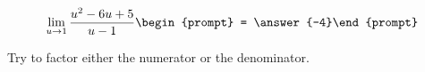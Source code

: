 \documentclass{ximera}
\author{Bart Snapp}
\begin{document}
\begin{exercise}

\[
\lim_{u\to 1 } \frac{u^2-6 u+5}{u-1}\begin{prompt} = \answer{-4}\end{prompt}
\]
\begin{hint}
Try to factor either the numerator or the denominator.
\end{hint}
\end{exercise}
\end{document}

